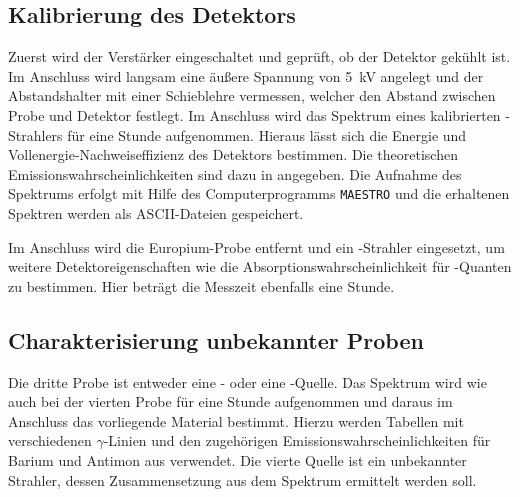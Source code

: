 \subsection{Kalibrierung des Detektors}
\label{sec:KalibrierungBeschreibung}

Zuerst wird der Verstärker eingeschaltet und geprüft, ob der Detektor gekühlt ist.
Im Anschluss wird langsam eine äußere Spannung von \SI{5}{\kilo\volt} angelegt
und der Abstandshalter mit einer Schieblehre vermessen,
welcher den Abstand zwischen Probe und Detektor festlegt.
Im Anschluss wird das Spektrum eines kalibrierten -Strahlers für eine Stunde aufgenommen.
Hieraus lässt sich die Energie und Vollenergie-Nachweiseffizienz
des Detektors bestimmen.
Die theoretischen Emissionswahrscheinlichkeiten sind dazu in \cite[28]{anleitung} angegeben.
Die Aufnahme des Spektrums erfolgt mit Hilfe des Computerprogramms
\texttt{MAESTRO} und die erhaltenen Spektren werden als ASCII-Dateien gespeichert.

Im Anschluss wird die Europium-Probe entfernt und ein -Strahler eingesetzt,
um weitere Detektoreigenschaften wie die Absorptionswahrscheinlichkeit für
-Quanten zu bestimmen.
Hier beträgt die Messzeit ebenfalls eine Stunde.

\subsection{Charakterisierung unbekannter Proben}
\label{sec:CharakterisierungBeschreibung}

Die dritte Probe ist entweder eine - oder eine -Quelle.
Das Spektrum wird wie auch bei der vierten Probe für eine Stunde aufgenommen
und daraus im Anschluss das vorliegende Material bestimmt.
Hierzu werden Tabellen mit verschiedenen $\gamma$-Linien und den zugehörigen
Emissionswahrscheinlichkeiten für Barium und Antimon aus \cite[28]{anleitung}
verwendet.
Die vierte Quelle ist ein unbekannter Strahler, dessen Zusammensetzung
aus dem Spektrum ermittelt werden soll.
